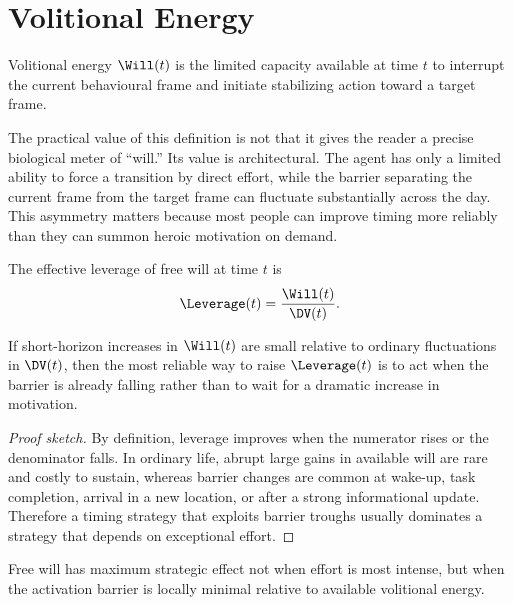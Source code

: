 \section{Volitional Energy}

\begin{definition}
Volitional energy $\Will(t)$ is the limited capacity available at time $t$ to
interrupt the current behavioural frame and initiate stabilizing action toward
a target frame.
\end{definition}

\begin{discussion}
The practical value of this definition is not that it gives the reader a
precise biological meter of ``will.'' Its value is architectural. The agent
has only a limited ability to force a transition by direct effort, while the
barrier separating the current frame from the target frame can fluctuate
substantially across the day. This asymmetry matters because most people can
improve timing more reliably than they can summon heroic motivation on demand.
\end{discussion}

\begin{definition}[Leverage]
The effective leverage of free will at time $t$ is
\[
  \Leverage(t) = \frac{\Will(t)}{\DV(t)}.
\]
\end{definition}

\begin{proposition}
If short-horizon increases in $\Will(t)$ are small relative to ordinary
fluctuations in $\DV(t)$, then the most reliable way to raise
$\Leverage(t)$ is to act when the barrier is already falling rather than to
wait for a dramatic increase in motivation.
\end{proposition}

\begin{proof}[Proof sketch]
By definition, leverage improves when the numerator rises or the denominator
falls. In ordinary life, abrupt large gains in available will are rare and
costly to sustain, whereas barrier changes are common at wake-up, task
completion, arrival in a new location, or after a strong informational update.
Therefore a timing strategy that exploits barrier troughs usually dominates a
strategy that depends on exceptional effort.
\end{proof}

\begin{theorem}
Free will has maximum strategic effect not when effort is most intense, but
when the activation barrier is locally minimal relative to available
volitional energy.
\end{theorem}

